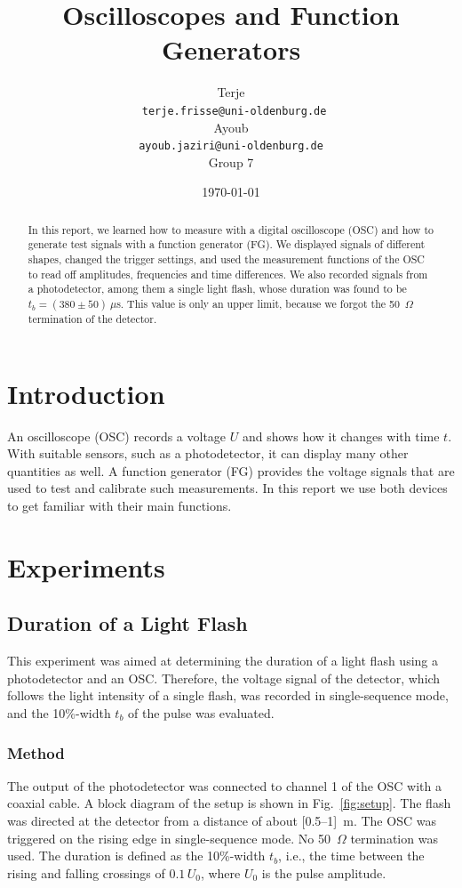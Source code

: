 \documentclass[12pt,a4paper]{article}
\title{Oscilloscopes and Function Generators}
\author{Terje\\
        \texttt{	
terje.frisse@uni-oldenburg.de}\\Ayoub\\\texttt{ayoub.jaziri@uni-oldenburg.de}\\Group 7}
\date{\today}
\begin{document}
\maketitle

\begin{abstract}
In this report, we learned how to measure with a digital oscilloscope (OSC)
and how to generate test signals with a function generator (FG). We
displayed signals of different shapes, changed the trigger settings, and used
the measurement functions of the OSC to read off amplitudes, frequencies and
time differences. We also recorded signals from a photodetector, among them
a single light flash, whose duration was found to be
$t_b = (380 \pm 50)~\mu$s. This value is only an upper limit, because we
forgot the 50~$\Omega$ termination of the detector.
\end{abstract}

\section{Introduction}
An oscilloscope (OSC) records a voltage $U$ and shows how it changes with
time $t$. With suitable sensors, such as a photodetector, it can display
many other quantities as well. A function generator (FG) provides the
voltage signals that are used to test and calibrate such measurements. In
this report we use both devices to get familiar with their main functions.

\section{Experiments}
\subsection{Duration of a Light Flash}
This experiment was aimed at determining the duration of a light flash using a photodetector and an OSC. Therefore, the voltage signal of the detector, which follows the light intensity of a single flash, was recorded in single-sequence mode, and the 10\%-width $t_b$ of the pulse was evaluated.

\subsubsection{Method}
The output of the photodetector was connected to channel 1 of the OSC with a coaxial cable. A block diagram of the setup is shown in Fig.~\ref{fig:setup}. The flash was directed at the detector from a distance of about [0.5--1]~m. The OSC was triggered on the rising edge in single-sequence mode. No 50~$\Omega$ termination was used. The duration is defined as the 10\%-width $t_b$, i.e., the time between the rising and falling crossings of $0.1\,U_0$, where $U_0$ is the pulse amplitude.
\end{document}
